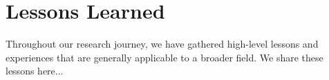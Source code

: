 \section{Lessons Learned}
\label{sec:conclusion:lessons}

Throughout our research journey, we have gathered high-level lessons and experiences that are generally applicable to a broader field. We share these lessons here...
